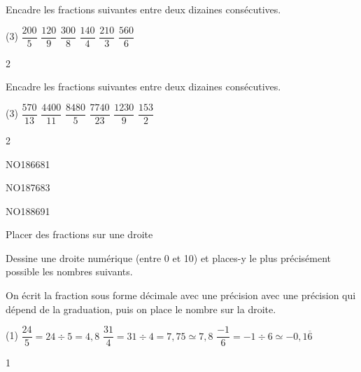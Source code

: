 \documentclass[a4paper,12pt]{report}
\begin{document}
\begin{exo}{
Encadre les fractions suivantes entre deux dizaines consécutives.
	\begin{tasks}(3)
\task $\dfrac{200}{5}$
\task $\dfrac{120}{9}$
\task $\dfrac{300}{8}$
\task $\dfrac{140}{4}$
\task $\dfrac{210}{3}$
\task $\dfrac{560}{6}$
\end{tasks}
 \vspace{1pt}
}{2}\end{exo}

\begin{exo}{
Encadre les fractions suivantes entre deux dizaines consécutives.
	\begin{tasks}(3)
\task $\dfrac{570}{13}$
\task $\dfrac{4400}{11}$
\task $\dfrac{8480}{5}$
\task $\dfrac{7740}{23}$
\task $\dfrac{1230}{9}$
\task $\dfrac{153}{2}$
\end{tasks}
 \vspace{1pt}
}{2}\end{exo}

\begin{exof}{NO186}{68}{1}
\end{exof}
\begin{exof}{NO187}{68}{3}
\end{exof}
\begin{exof}{NO188}{69}{1}
\end{exof}



\begin{resolu}{Placer des fractions sur une droite}{
Dessine une droite numérique (entre 0 et 10) et places-y le plus précisément possible les nombres suivants.

{\color{blue} On écrit la fraction sous forme décimale avec une précision avec une précision qui dépend de la graduation, puis on place le nombre sur la droite. 
}

\begin{tasks}(1)
	\task $\dfrac{24}{5}=24\div 5=4,8$
	\task $\dfrac{31}{4}=31\div 4=7,75\simeq 7,8$
	\task $\dfrac{-1}{6}=-1\div 6\simeq -0,1\overline{6}$
\end{tasks}
\centering
{}}{1}
\end{resolu}
\end{document}
